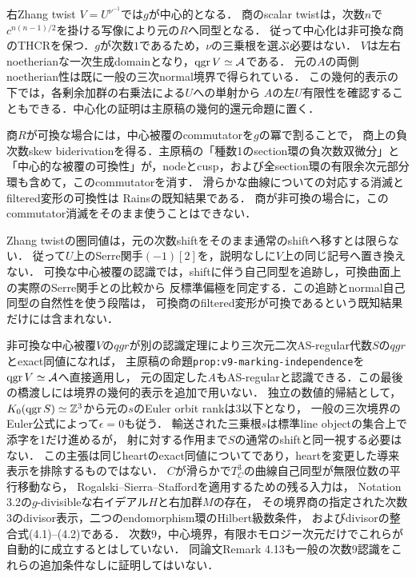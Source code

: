 \documentclass[11pt,a4paper]{ltjsarticle}
\begin{document}
右Zhang twist $V=U^{\nu^{-1}}$では$g$が中心的となる．
商のscalar twistは，次数$n$で$c^{n(n-1)/2}$を掛ける写像により元の$R$へ同型となる．
従って中心化は非可換な商のTHCRを保つ．$g$が次数$1$であるため，$\nu$の三乗根を選ぶ必要はない．
$V$は左右noetherianな一次生成domainとなり，$\operatorname{qgr} V\simeq\mathcal A$である．
元の$A$の両側noetherian性は既に一般の三次normal境界で得られている．
この幾何的表示の下では，各剰余加群の右乗法による$U$への単射から
$A$の左$U$有限性を確認することもできる．中心化の証明は主原稿の幾何的還元命題に置く．

商$R$が可換な場合には，中心被覆のcommutatorを$g$の冪で割ることで，
商上の負次数skew biderivationを得る．主原稿の「種数1のsection環の負次数双微分」と
「中心的な被覆の可換性」が，nodeとcusp，および全section環の有限余次元部分環も含めて，このcommutatorを消す．
滑らかな曲線についての対応する消滅とfiltered変形の可換性は
Rains\cite[Lemma 2.4, Corollaries 2.5--2.6]{RainsFiltered}の既知結果である．
商が非可換の場合に，このcommutator消滅をそのまま使うことはできない．

Zhang twistの圏同値は，元の次数shiftをそのまま通常のshiftへ移すとは限らない．
従って$U$上のSerre関手$(-1)[2]$を，説明なしに$V$上の同じ記号へ置き換えない．
可換な中心被覆の認識では，shiftに伴う自己同型を追跡し，可換曲面上の実際のSerre関手との比較から
反標準偏極を同定する．この追跡とnormal自己同型の自然性を使う段階は，
可換商のfiltered変形が可換であるという既知結果だけには含まれない．

非可換な中心被覆$V$の$qgr$が別の認識定理により三次元二次AS-regular代数$S$の$qgr$とexact同値になれば，
主原稿の命題\texttt{prop:v9-marking-independence}を$\operatorname{qgr} V\simeq\mathcal A$へ直接適用し，
元の固定した$A$もAS-regularと認識できる．この最後の橋渡しには境界の幾何的表示を追加で用いない．
独立の数値的帰結として，$K_0(\operatorname{qgr} S)\simeq\mathbb Z^3$から元の$s$のEuler orbit rankは$3$以下となり，
一般の三次境界のEuler公式によって$\epsilon=0$も従う．
輸送された三乗根$s$は標準line objectの集合上で添字を1だけ進めるが，
射に対する作用まで$S$の通常のshiftと同一視する必要はない．
この主張は同じheartのexact同値についてであり，heartを変更した導来表示を排除するものではない．
$C$が滑らかで$T_C^3$の曲線自己同型が無限位数の平行移動なら，
Rogalski--Sierra--Stafford\cite[Theorem 4.3]{RSS}を適用するための残る入力は，
Notation 3.2の$g$-divisibleな右イデアル$H$と右加群$M$の存在，
その境界商の指定された次数$3$のdivisor表示，二つのendomorphism環のHilbert級数条件，
およびdivisorの整合式(4.1)--(4.2)である．
次数$9$，中心境界，有限ホモロジー次元だけでこれらが自動的に成立するとはしていない．
同論文Remark 4.13も一般の次数$9$認識をこれらの追加条件なしに証明してはいない．
\end{document}
